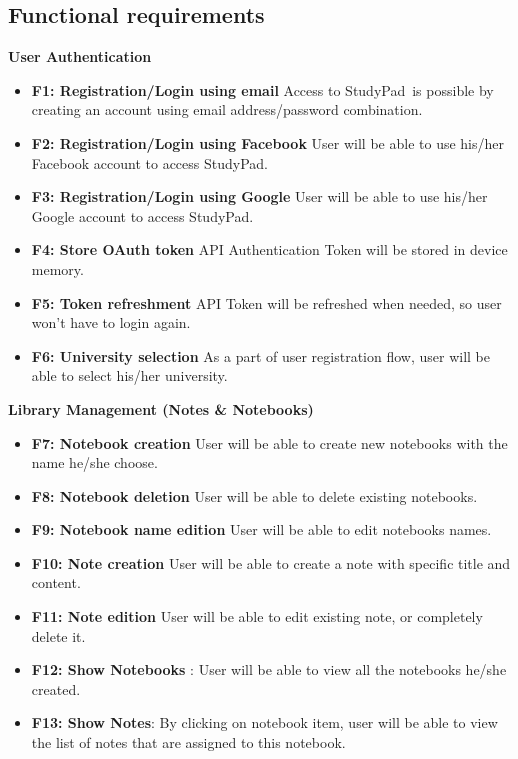 \documentclass[thesis=B,english]{FITthesis}[2012/10/20]
\newcommand{\appname}{StudyPad}
\begin{document}
\subsection{Functional requirements}
\bigskip
\textbf{User Authentication}
\begin{itemize}
	\item \textbf{F1: Registration/Login using email} Access to \appname\ is possible by creating an account using email address/password combination.
	\item \textbf{F2: Registration/Login using Facebook} User will be able to use his/her Facebook account to access \appname.
	\item \textbf{F3: Registration/Login using Google} User will be able to use his/her Google account to access \appname.
	\item \textbf{F4: Store OAuth token} API Authentication Token will be stored in device memory.
	\item \textbf{F5: Token refreshment} API Token will be refreshed when needed, so user won't have to login again.
	\item \textbf{F6: University selection} As a part of user registration flow, user will be able to select his/her university.
\end{itemize}
\bigskip
\textbf{Library Management (Notes \& Notebooks)}
\begin{itemize}
	\item \textbf{F7: Notebook creation} User will be able to create new notebooks with the name he/she choose.
	\item \textbf{F8: Notebook deletion} User will be able to delete existing notebooks.
	\item \textbf{F9: Notebook name edition} User will be able to edit notebooks names.
	\item \textbf{F10: Note creation} User will be able to create a note with specific title and content.
	\item \textbf{F11: Note edition} User will be able to edit existing note, or completely delete it.
	\item \textbf{F12: Show Notebooks} : User will be able to view all the notebooks he/she created.
	\item \textbf{F13: Show Notes}: By clicking on notebook item, user will be able to view the list of notes that are assigned to this notebook.
\end{itemize}
\end{document}
